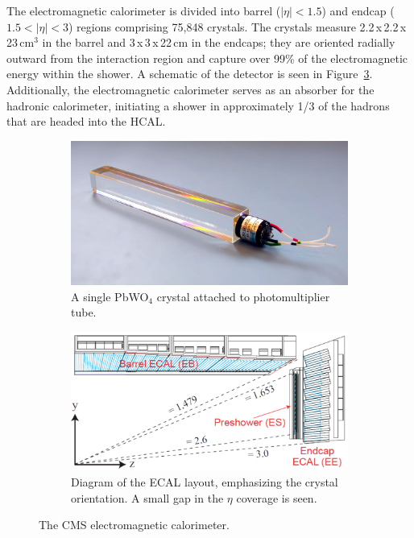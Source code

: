 The electromagnetic calorimeter is divided into barrel ($|\eta|<1.5$) and endcap ($1.5<|\eta|<3$) regions comprising 75,848 crystals. The crystals measure 2.2$\,$x$\,$2.2$\,$x$\,$23$\,$cm$^{3}$ in the barrel and 3$\,$x$\,$3$\,$x$\,$22$\,$cm in the endcaps; they are oriented radially outward from the interaction region and capture over 99\% of the electromagnetic energy within the shower. A schematic of the detector is seen in Figure~\ref{fig:ecal}. Additionally, the electromagnetic calorimeter serves as an absorber for the hadronic calorimeter, initiating a shower in approximately 1/3 of the hadrons that are headed into the HCAL.

\begin{figure}
\centering
\begin{subfigure}[b]{0.35\textwidth}
\includegraphics[width=\textwidth]{figs/ecalcrystal.jpg}
\caption{A single PbWO$_{4}$ crystal attached to photomultiplier tube.}
\label{fig:ecalcrystal}
\end{subfigure}
\begin{subfigure}[b]{0.625\textwidth}
\includegraphics[width=\textwidth]{figs/ecal.png}
\caption{Diagram of the ECAL layout, emphasizing the crystal orientation. A small gap in the $\eta$ coverage is seen.}
\label{fig:ecal}
\end{subfigure}
\caption{The CMS electromagnetic calorimeter.}
\end{figure}

